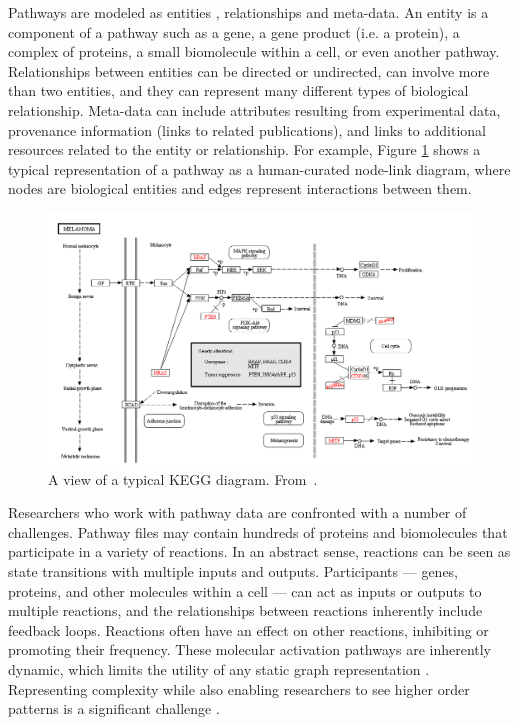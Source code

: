 \documentclass{egpubl}
\begin{document}
Pathways are modeled as entities , relationships and meta-data.
An entity is a component of a pathway such as a gene, a gene product (i.e. a protein), a complex of proteins, a small biomolecule within a cell, or even another pathway.
Relationships between entities can be directed or undirected, can involve more than two entities, and they can represent many different types of biological relationship.
Meta-data can include attributes resulting from experimental data, provenance information (links to related publications), and links to additional resources related to the entity or relationship.
For example, Figure \ref{fig:kvik} shows a typical representation of a pathway as a human-curated node-link diagram, where nodes are biological entities and edges represent interactions between them.

\begin{figure}[htb]
  \centering
  \includegraphics[width=\linewidth]{figures/kegg2}
  \caption{\label{fig:kvik} A view of a typical KEGG diagram. From~\cite{Fjukstad2014kvik}.}
\end{figure}


Researchers who work with pathway data are confronted with a number of challenges.
Pathway files may contain hundreds of proteins and biomolecules that participate in a variety of reactions.
In an abstract sense, reactions can be seen as state transitions with multiple inputs and outputs.
Participants --- genes, proteins, and other molecules within a cell --- can act as inputs or outputs to multiple reactions, and the relationships between reactions inherently include feedback loops.
Reactions often have an effect on other reactions, inhibiting or promoting their frequency.
These molecular activation pathways are inherently dynamic, which limits the utility of any static graph representation \cite{kitano2002systems}.
Representing complexity while also enabling researchers to see higher order patterns is a significant challenge \cite{saraiya2005visualizing}.
\end{document}
